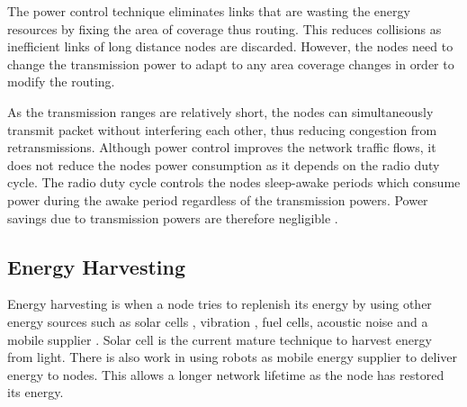 The power control technique eliminates links that are wasting the energy resources by fixing the area of coverage thus routing. This reduces collisions as inefficient links of long distance nodes are discarded. However, the nodes need to change the transmission power to adapt to any area coverage changes in order to modify the routing. 

As the transmission ranges are relatively short, the nodes can simultaneously transmit packet without interfering each other, thus reducing congestion from retransmissions. Although power control improves the network traffic flows, it does not reduce the nodes power consumption as it depends on the radio duty cycle. The radio duty cycle controls the nodes sleep-awake periods which consume power during the awake period regardless of the transmission powers. Power savings due to transmission powers are therefore negligible \cite{macsurvey}.


\subsection{Energy Harvesting}

Energy harvesting is when a node tries to replenish its energy by using other energy sources such as solar cells \cite{wsnheap, reviewharvest}, vibration \cite{gilbert2008comparison}, fuel cells, acoustic noise and a mobile supplier \cite{wsnSurvey1}. Solar cell is the current mature technique to harvest energy from light. There is also work in using robots as mobile energy supplier to deliver energy to nodes. This allows a longer network lifetime as the node has restored its energy. 

